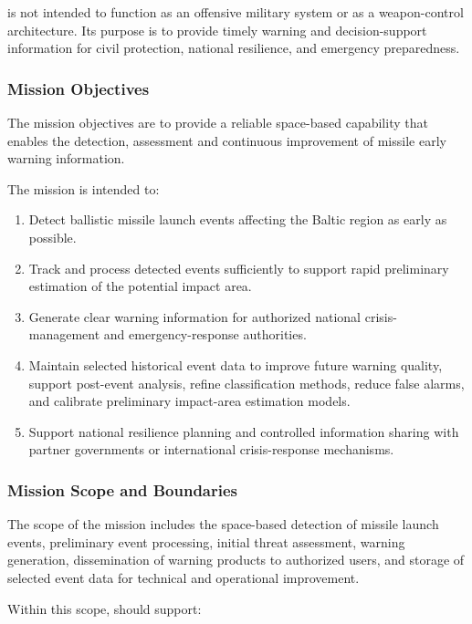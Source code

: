  is not intended to function as an offensive military system or as a weapon-control architecture. Its purpose is to provide timely warning and decision-support information for civil protection, national resilience, and emergency preparedness.

\subsubsection{Mission Objectives}

The  mission objectives are to provide a reliable space-based capability that enables the detection, assessment and continuous improvement of missile early warning information.

The mission is intended to:

\begin{enumerate}
    \item Detect ballistic missile launch events affecting the Baltic region as early as possible.
    \item Track and process detected events sufficiently to support rapid preliminary estimation of the potential impact area.
    \item Generate clear warning information for authorized national crisis-management and emergency-response authorities.
    \item Maintain selected historical event data to improve future warning quality, support post-event analysis, refine classification methods, reduce false alarms, and calibrate preliminary impact-area estimation models.
    \item Support national resilience planning and controlled information sharing with partner governments or international crisis-response mechanisms.
\end{enumerate}

\subsubsection{Mission Scope and Boundaries}

The scope of the  mission includes the space-based detection of missile launch events, preliminary event processing, initial threat assessment, warning generation, dissemination of warning products to authorized users, and storage of selected event data for technical and operational improvement.

Within this scope,  should support:

